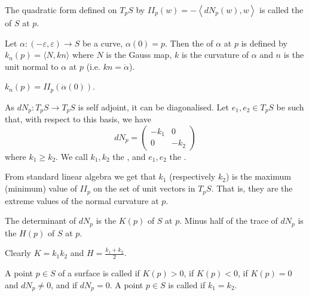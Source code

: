 \documentclass[10pt]{article}
\begin{document}
\begin{definition}
    The quadratic form defined on $T_p S$ by $II_p(w)=-\left\langle d N_p(w), w\right\rangle$ is called the  of $S$ at $p$.
\end{definition}

\begin{definition}
    Let $\alpha: (-\varepsilon, \varepsilon) \rightarrow S$ be a curve, $\alpha(0) = p$. Then the  of $\alpha$ at $p$ is defined by $k_n(p) = \langle N, k n\rangle$ where $N$ is the Gauss map, $k$ is the curvature of $\alpha$ and $n$ is the unit normal to $\alpha$ at $p$ (i.e. $kn = \ddot \alpha$). 
\end{definition}

\begin{proposition}
    $k_n(p) = II_p(\dot\alpha(0))$.
\end{proposition}

\begin{definition}
    As $dN_p: T_p S \rightarrow T_p S$ is self adjoint, it can be diagonalised. Let $e_1, e_2 \in T_p S$ be such that, with respect to this basis, we have
$$
d N_p=\begin{pmatrix}
-k_1 & 0 \\
0 & -k_2
\end{pmatrix}
$$
where $k_1 \geq k_2$. We call $k_1, k_2$ the , and $e_1, e_2$ the .
\end{definition}

From standard linear algebra we get that $k_1$ (respectively $k_2$) is the maximum (minimum) value of $II_p$ on the set of unit vectors in $T_p S$. That is, they are the extreme values of the normal curvature at $p$.

\begin{definition}
    The determinant of $d N_p$ is the  $K(p)$ of $S$ at $p$. Minus half of the trace of $d N_p$ is the  $H(p)$ of $S$ at $p$.
\end{definition}

Clearly $K=k_1 k_2$ and $H=\frac{k_1+k_2}{2}$. 

A point $p \in S$ of a surface is called  if $K(p)>0$,  if $K(p)<0$,  if $K(p)=0$ and $d N_p \neq 0$, and  if $d N_p=0$.
A point $p \in S$ is called  if $k_1=k_2$.
\end{document}
